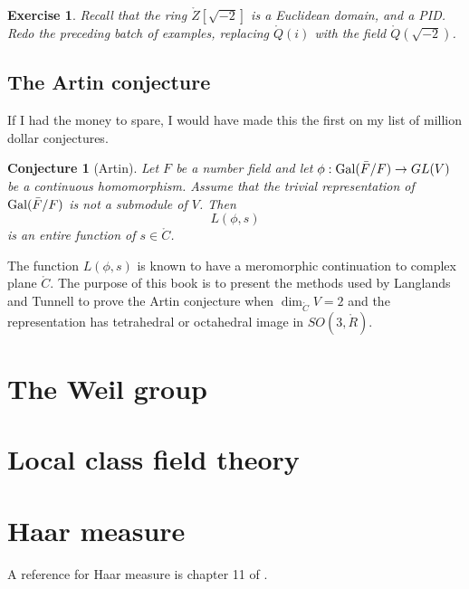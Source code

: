 \documentclass{amsart}
\newtheorem{conjecture}[equation]{Conjecture}
\newtheorem{exercise}{Exercise}
\begin{document}
\begin{exercise} Recall that the ring $\ring{Z}[\sqrt{-2}]$ is a
  Euclidean domain, and a PID.  Redo the preceding batch of examples,
  replacing $\ring{Q}(i)$ with the field $\ring{Q}(\sqrt{-2})$.
\end{exercise}

\subsection{The Artin conjecture}

If I had the money to spare, I would have made this the first on my
list of million dollar conjectures.

\begin{conjecture}[Artin] Let $F$ be a number field and let
  $\phi:{\operatorname{Gal}}(\bar F/F)\to GL(V)$ be a continuous homomorphism.
  Assume that the trivial representation of ${\operatorname{Gal}}(\bar F/F)$ is
  not a submodule of $V$.  Then
\[
L(\phi,s)
\]
is an entire function of $s\in \ring{C}$.
\end{conjecture}

The function $L(\phi,s)$ is known to have a meromorphic continuation
to complex plane $\ring{C}$.  The purpose of this book is to
present the methods used by Langlands and Tunnell to prove the Artin
conjecture when $\dim_{\ring{C}}V = 2$ and the representation has
tetrahedral or octahedral image in $SO(3,\ring{R})$.

\newpage

\section{The Weil group}


\section{Local class field theory}

\section{Haar measure}

A reference for Haar measure is chapter 11 of \cite{Halmos-measure}.



\raggedright




\end{document}

